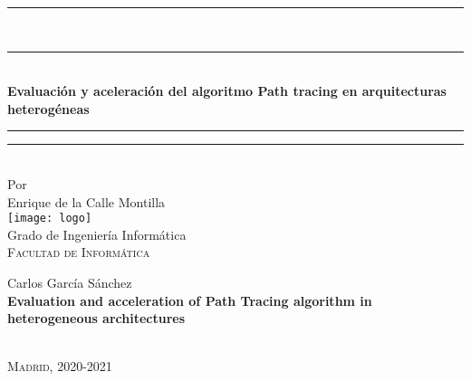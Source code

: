 

\begin{center}
    \rule[0.5ex]{\linewidth}{2pt}\vspace*{-\baselineskip}\vspace*{3.2pt}\\
    \rule[0.5ex]{\linewidth}{2pt}\\
    [2mm]
    {\textbf{\LARGE{Evaluación y aceleración del algoritmo Path tracing en arquitecturas heterogéneas}} }\\[3mm] %
    
    \rule[0.5ex]{\linewidth}{1pt}\vspace*{-\baselineskip}\vspace{3.2pt}
    \rule[0.5ex]{\linewidth}{2pt}\\
    \vspace{6.5mm}
    {\large Por\\Enrique de la Calle Montilla}
    \vspace{6.5mm}
    {\large\textsc{}}\\ %
    \vspace{5mm}
    \texttt{[image: logo]}\\ %
    \vspace{6mm}
    {\large Grado de Ingeniería Informática\\    %
    \textsc{Facultad de Informática}}\\ %
    \vspace{11mm}
    \begin{minipage}{10cm}
    \begin{center}
    Carlos García Sánchez\\
      \textbf{Evaluation and acceleration of Path Tracing algorithm in heterogeneous architectures}\\
      \vspace{2mm}
    \end{center}
    \vspace{4mm}
    
    \end{minipage}\\
    \vspace{4mm}
    {\large\textsc{Madrid, 2020-2021}} %
    \vspace{12mm}
\end{center}
